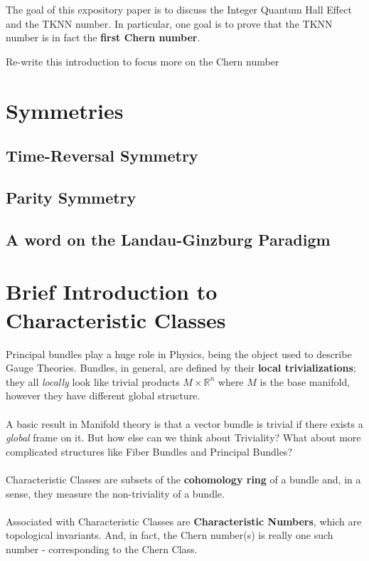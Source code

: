 \documentclass[11pt]{article}
\begin{document}
\\
\\
The goal of this expository paper is to discuss the Integer Quantum Hall Effect and the TKNN number. In particular, one goal is to prove that the TKNN number is in fact the \textbf{first Chern number}.
\begin{note}
    {Re-write this introduction to focus more on the Chern number}
\end{note}

\pagebreak
\section{Symmetries}

\subsection{Time-Reversal Symmetry}

\subsection*{Parity Symmetry}

\subsection{A word on the Landau-Ginzburg Paradigm}

\pagebreak
\section{Brief Introduction to Characteristic Classes}
Principal bundles play a huge role in Physics, being the object used to describe Gauge Theories. Bundles, in general, are defined by their \textbf{local trivializations}; they all \emph{locally} look like trivial products $M \times \mathbb{R}^n$ where $M$ is the base manifold, however they have different global structure. 
\\
\\
A basic result in Manifold theory is that a vector bundle is trivial if there exists a \textit{global} frame on it. But how else can we think about Triviality? What about more complicated structures like Fiber Bundles and Principal Bundles? 
\\
\\
Characteristic Classes are subsets of the \textbf{cohomology ring} of a bundle and, in a sense, they measure the non-triviality of a bundle.
\\
\\
Associated with Characteristic Classes are \textbf{Characteristic Numbers}, which are topological invariants. And, in fact, the Chern number(s) is really one such number - corresponding to the Chern Class.
\end{document}
